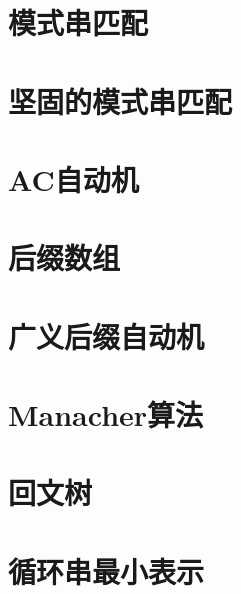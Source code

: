 \documentclass[landscape, oneside, a4paper, cs4size]{book}
\begin{document}
\begin{multicols}{2}
			\section{模式串匹配}
			\begin{spacing}{0.8}
				
			\end{spacing}
			\section{坚固的模式串匹配}
			\begin{spacing}{0.8}
				
			\end{spacing}
			\section{AC自动机}
			\begin{spacing}{0.8}
				
			\end{spacing}
			\section{后缀数组}
			\begin{spacing}{0.8}
				
			\end{spacing}
			\section{广义后缀自动机}
			\begin{spacing}{0.8}
				
			\end{spacing}
			\section{Manacher算法}
			\begin{spacing}{0.8}
				
			\end{spacing}
			\section{回文树}
			\begin{spacing}{0.8}
				
			\end{spacing}
			\section{循环串最小表示}
			\begin{spacing}{0.8}
				
			\end{spacing}

\end{multicols}
\end{document}
